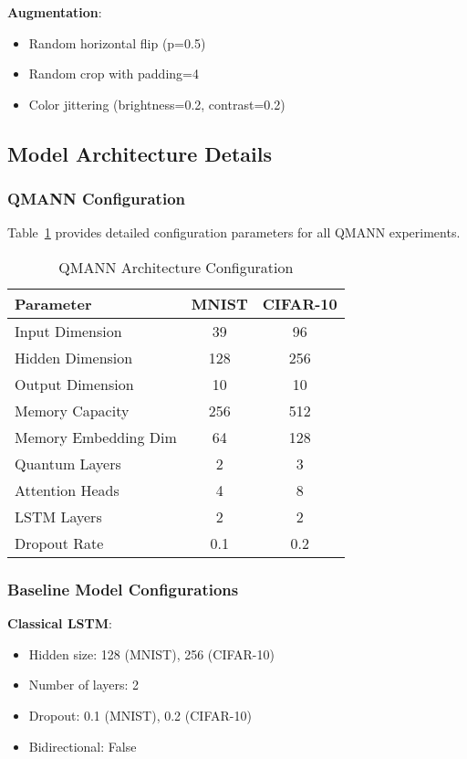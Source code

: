 \textbf{Augmentation}:
\begin{itemize}
    \item Random horizontal flip (p=0.5)
    \item Random crop with padding=4
    \item Color jittering (brightness=0.2, contrast=0.2)
\end{itemize}

\subsection{Model Architecture Details}

\subsubsection{QMANN Configuration}

Table~\ref{tab:qmann_config} provides detailed configuration parameters for all QMANN experiments.

\begin{table}[htbp]
    \centering
    \caption{QMANN Architecture Configuration}
    \label{tab:qmann_config}
    \begin{tabular}{lcc}
        \toprule
        Parameter & MNIST & CIFAR-10 \\
        \midrule
        Input Dimension & 39 & 96 \\
        Hidden Dimension & 128 & 256 \\
        Output Dimension & 10 & 10 \\
        Memory Capacity & 256 & 512 \\
        Memory Embedding Dim & 64 & 128 \\
        Quantum Layers & 2 & 3 \\
        Attention Heads & 4 & 8 \\
        LSTM Layers & 2 & 2 \\
        Dropout Rate & 0.1 & 0.2 \\
        \bottomrule
    \end{tabular}
\end{table}

\subsubsection{Baseline Model Configurations}

\textbf{Classical LSTM}:
\begin{itemize}
    \item Hidden size: 128 (MNIST), 256 (CIFAR-10)
    \item Number of layers: 2
    \item Dropout: 0.1 (MNIST), 0.2 (CIFAR-10)
    \item Bidirectional: False
\end{itemize}

